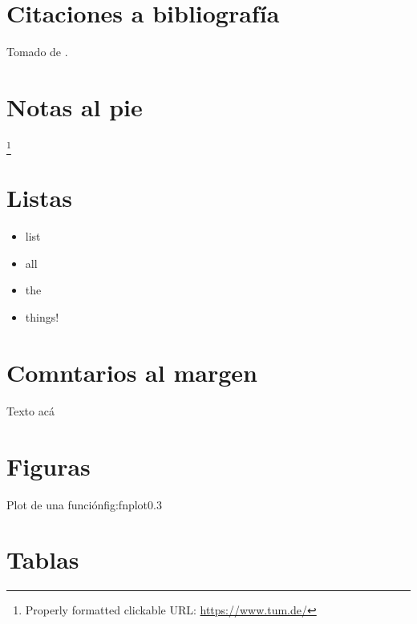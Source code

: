 
\section*{Citaciones a bibliografía}
\tinylipsum Tomado de \cite{latex}.

\section*{Notas al pie}
\tinylipsum \footnote{Properly formatted clickable URL: \url{https://www.tum.de/}}

\section*{Listas}
\tinylipsum
\begin{itemize}
	\item list
	\item all
	\item the
	\item things!
\end{itemize}
\tinylipsum

\section*{Comntarios al margen}
Texto acá 

\section*{Figuras}
\tinylipsum
{}%
{Plot de una función}{fig:fnplot}{0.3}
\tinylipsum

\section*{Tablas}

\tinylipsum


